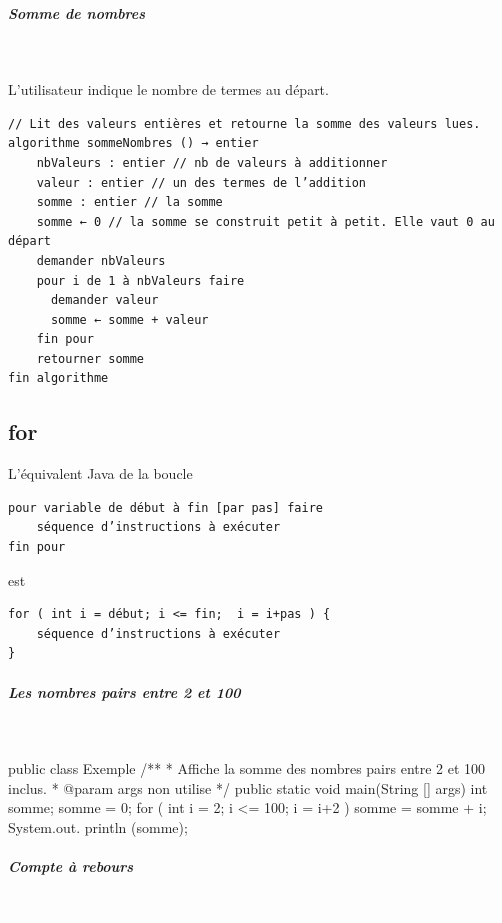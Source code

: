 \documentclass[11pt,a4paper]{article}
\begin{document}
		\subparagraph{Somme de nombres} 
		
					\textcolor{white}{.} \par
				L'utilisateur indique le nombre de termes au d\'epart.
            \par
        \begin{verbatim}
// Lit des valeurs entières et retourne la somme des valeurs lues.
algorithme sommeNombres () → entier
    nbValeurs : entier // nb de valeurs à additionner
    valeur : entier // un des termes de l’addition
    somme : entier // la somme
    somme ← 0 // la somme se construit petit à petit. Elle vaut 0 au départ
    demander nbValeurs
    pour i de 1 à nbValeurs faire
      demander valeur
      somme ← somme + valeur
    fin pour
    retourner somme
fin algorithme
    \end{verbatim}\subsection{for}
		    L'\'equivalent Java de la boucle 
		  
            \par
        \begin{verbatim}
pour variable de début à fin [par pas] faire
    séquence d’instructions à exécuter
fin pour
      \end{verbatim}est 
            \par
        \begin{verbatim}
for ( int i = début; i <= fin;  i = i+pas ) {
    séquence d’instructions à exécuter
}
  \end{verbatim}
			
		\subparagraph{Les nombres pairs entre 2 et 100} 
		
					\textcolor{white}{.} \par
				
            \par
        \begin{Java}
public class Exemple {
    /**
    * Affiche la somme des nombres pairs entre 2 et 100 inclus.
    * @param args non utilise
    */
    public static void main(String [] args) {
      int somme;
      somme = 0;
      for ( int i = 2; i <= 100; i = i+2 ) {
        somme = somme + i;
      }
      System.out. println (somme);
    }
}\end{Java}
			
		\subparagraph{Compte \`a rebours} 
		
					\textcolor{white}{.} \par
				
\end{document}
